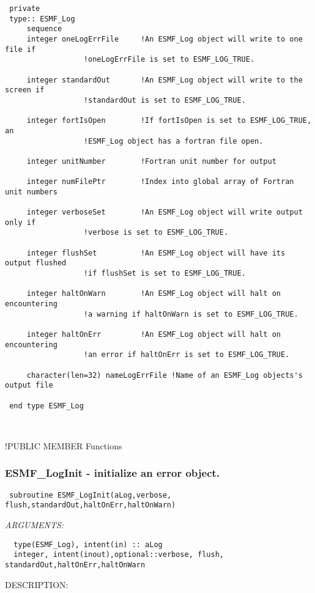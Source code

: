 \begin{verbatim} private
 type:: ESMF_Log
     sequence
     integer oneLogErrFile     !An ESMF_Log object will write to one file if
 			      !oneLogErrFile is set to ESMF_LOG_TRUE.
 
     integer standardOut       !An ESMF_Log object will write to the screen if
 			      !standardOut is set to ESMF_LOG_TRUE.
 
     integer fortIsOpen        !If fortIsOpen is set to ESMF_LOG_TRUE, an 
 			      !ESMF_Log object has a fortran file open.
 
     integer unitNumber        !Fortran unit number for output
 
     integer numFilePtr        !Index into global array of Fortran unit numbers 
 
     integer verboseSet        !An ESMF_Log object will write output only if
 			      !verbose is set to ESMF_LOG_TRUE.
     
     integer flushSet          !An ESMF_Log object will have its output flushed
 			      !if flushSet is set to ESMF_LOG_TRUE.
 
     integer haltOnWarn        !An ESMF_Log object will halt on encountering
 			      !a warning if haltOnWarn is set to ESMF_LOG_TRUE. 
 
     integer haltOnErr         !An ESMF_Log object will halt on encountering
 			      !an error if haltOnErr is set to ESMF_LOG_TRUE. 
 
     character(len=32) nameLogErrFile !Name of an ESMF_Log objects's output file 
 
 end type ESMF_Log\end{verbatim}
 
 
\mbox{}\hrulefill\ 
 

   !PUBLIC MEMBER Functions\subsubsection [ESMF\_LogInit] {ESMF\_LogInit - initialize an error object.}


  
\begin{verbatim} subroutine ESMF_LogInit(aLog,verbose, flush,standardOut,haltOnErr,haltOnWarn)\end{verbatim}{\em ARGUMENTS:}
\begin{verbatim}  type(ESMF_Log), intent(in) :: aLog
  integer, intent(inout),optional::verbose, flush, standardOut,haltOnErr,haltOnWarn \end{verbatim}
{\sf DESCRIPTION:\\ }


